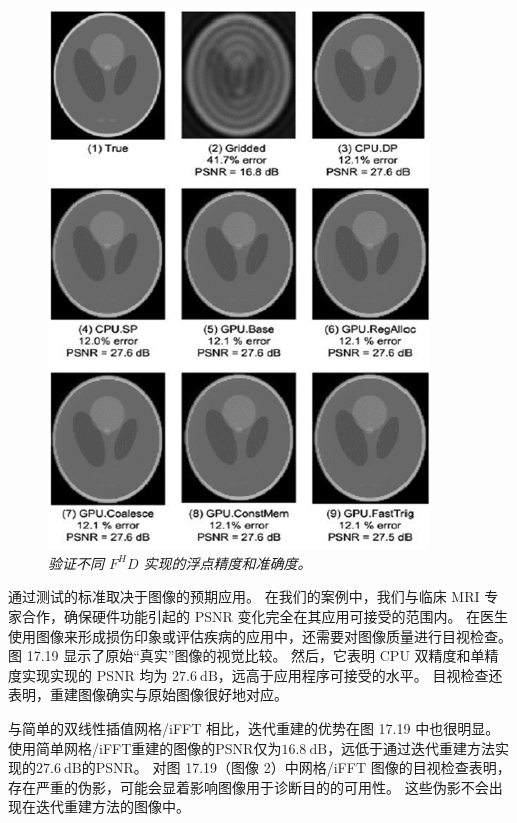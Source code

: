 \begin{figure}[H]
	\centering
	\includegraphics[width=0.9\textwidth]{figs/F17.19.png}
	\caption{\textit{验证不同 $F^H D$ 实现的浮点精度和准确度。}}
\end{figure}

通过测试的标准取决于图像的预期应用。 
在我们的案例中，我们与临床 MRI 专家合作，确保硬件功能引起的 PSNR 变化完全在其应用可接受的范围内。 
在医生使用图像来形成损伤印象或评估疾病的应用中，还需要对图像质量进行目视检查。 
图 17.19 显示了原始“真实”图像的视觉比较。 
然后，它表明 CPU 双精度和单精度实现实现的 PSNR 均为 $27.6 \mathrm{~dB}$，远高于应用程序可接受的水平。 
目视检查还表明，重建图像确实与原始图像很好地对应。

与简单的双线性插值网格/iFFT 相比，迭代重建的优势在图 17.19 中也很明显。 
使用简单网格/iFFT重建的图像的PSNR仅为$16.8 \mathrm{~dB}$，远低于通过迭代重建方法实现的$27.6 \mathrm{~dB}$的PSNR。 
对图 17.19（图像 2）中网格/iFFT 图像的目视检查表明，存在严重的伪影，可能会显着影响图像用于诊断目的的可用性。 
这些伪影不会出现在迭代重建方法的图像中。

